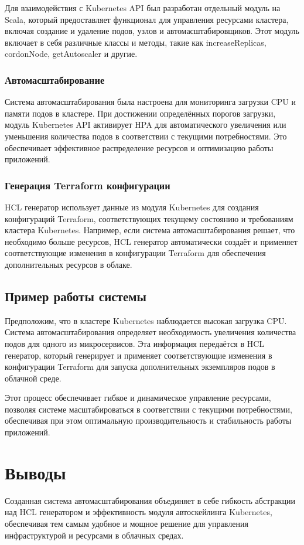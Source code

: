 Для взаимодействия с Kubernetes API был разработан отдельный модуль на Scala,
который предоставляет функционал для управления ресурсами кластера, включая
создание и удаление подов, узлов и автомасштабировщиков. Этот модуль включает в
себя различные классы и методы, такие как increaseReplicas, cordonNode,
getAutoscaler и другие.

\subsubsection{Автомасштабирование}

Система автомасштабирования была настроена для мониторинга загрузки CPU и памяти
подов в кластере. При достижении определённых порогов загрузки, модуль
Kubernetes API активирует HPA для автоматического увеличения или уменьшения
количества подов в соответствии с текущими потребностями. Это обеспечивает
эффективное распределение ресурсов и оптимизацию работы приложений.

\subsubsection{Генерация Terraform конфигурации}

HCL генератор использует данные из модуля Kubernetes для создания конфигураций
Terraform, соответствующих текущему состоянию и требованиям кластера Kubernetes.
Например, если система автомасштабирования решает, что необходимо больше
ресурсов, HCL генератор автоматически создаёт и применяет соответствующие
изменения в конфигурации Terraform для обеспечения дополнительных ресурсов в
облаке.

\subsection{Пример работы системы}

Предположим, что в кластере Kubernetes наблюдается высокая загрузка CPU. Система
автомасштабирования определяет необходимость увеличения количества подов для
одного из микросервисов. Эта информация передаётся в HCL генератор, который
генерирует и применяет соответствующие изменения в конфигурации Terraform для
запуска дополнительных экземпляров подов в облачной среде.

Этот процесс обеспечивает гибкое и динамическое управление ресурсами, позволяя
системе масштабироваться в соответствии с текущими потребностями, обеспечивая
при этом оптимальную производительность и стабильность работы приложений.

\section{Выводы}

Созданная система автомасштабирования объединяет в себе гибкость абстракции над
HCL генератором и эффективность модуля автоскейлинга Kubernetes, обеспечивая тем
самым удобное и мощное решение для управления инфраструктурой и ресурсами в
облачных средах.
